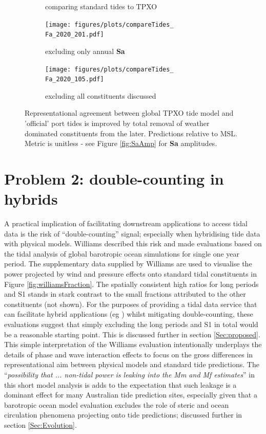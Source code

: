 \begin{figure}[H]
\begin{subfigure}[b]{\figwidthThird}
        \caption{\Fname{} comparing standard tides to TPXO}
    \end{subfigure}
    \begin{subfigure}[b]{\figwidthThird}
        \texttt{[image: figures/plots/compareTides\_\\Fa\_2020\_201.pdf]} 
        \caption{\Fname{} excluding only annual \textbf{Sa}}
    \end{subfigure}
    \begin{subfigure}[b]{\figwidthThird}
        \texttt{[image: figures/plots/compareTides\_\\Fa\_2020\_105.pdf]} 
        \caption{\Fname{} excluding all constituents discussed}
    \end{subfigure}
    
    \caption{Representational agreement between global TPXO tide model and 'official' port tides is improved by total removal of weather dominated constituents from the later.   Predictions relative to MSL.  Metric is unitless - see Figure \ref{fig:SaAmp} for \textbf{Sa} amplitudes.}
    \label{fig:improveOtps}
\end{figure}   


\section{Problem 2: double-counting in hybrids}
\label{Sec:DoubleCount}
A practical implication of facilitating downstream applications to access tidal data is the risk of ``double-counting'' signal; especially when hybridising tide data with physical models. 
Williams \citep{10.5194/os-2020-107} described this risk and made evaluations based on the tidal analysis of global barotropic ocean simulations for single one year period. 
The supplementary data supplied by Williams are used to visualise the power projected by wind and pressure effects onto standard tidal constituents in Figure \ref{fig:williamsFraction}.  The spatially consistent high ratios for long periods and S1 stands in stark contrast to the small fractions attributed to the other constituents (not shown).    
For the purposes of providing a tidal data service that can facilitate hybrid applications (eg \citep{Taylor:2017coa}) whilst mitigating double-counting, these evaluations suggest that simply excluding the long periods and S1 in total would be a reasonable starting point.   This is discussed further in  section \ref{Sec:proposed}.
This simple interpretation of the Williams evaluation intentionally underplays the details of phase and wave interaction effects to focus on the gross differences in representational aim between physical models and standard tide predictions. 
The ``\textit{possibility that ... non-tidal power is leaking into the Mm and Mf estimates}'' in this short model analysis is adds to the expectation that such leakage is a dominant effect for many Australian tide prediction sites, especially given that a barotropic ocean model evaluation excludes the role of steric and ocean circulation phenomena projecting onto tide predictions; discussed further in section \ref{Sec:Evolution}.

